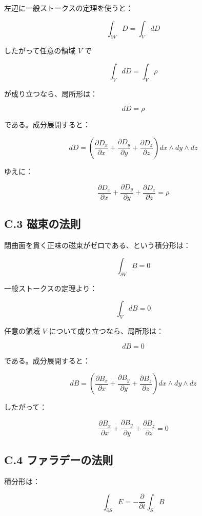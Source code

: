 \documentclass[a4paper,12pt,openany]{book}
\begin{document}
左辺に一般ストークスの定理を使うと：

\[
\int_{\partial V}D=\int_V dD
\]

したがって任意の領域 \(V\) で

\[
\int_V dD=\int_V\rho
\]

が成り立つなら、局所形は：

\[
dD=\rho
\]

である。成分展開すると：

\[
dD
=
\left(\frac{\partial D_x}{\partial x}
{}+\frac{\partial D_y}{\partial y}
{}+\frac{\partial D_z}{\partial z}\right)
dx\wedge dy\wedge dz
\]

ゆえに：

\[
\frac{\partial D_x}{\partial x}
{}+\frac{\partial D_y}{\partial y}
{}+\frac{\partial D_z}{\partial z}
=\rho
\]

\hypertarget{c.3-ux78c1ux675fux306eux6cd5ux5247}{%
\subsection*{C.3 磁束の法則}\label{c.3-ux78c1ux675fux306eux6cd5ux5247}}

閉曲面を貫く正味の磁束がゼロである、という積分形は：

\[
\int_{\partial V}B=0
\]

一般ストークスの定理より：

\[
\int_V dB=0
\]

任意の領域 \(V\) について成り立つなら、局所形は：

\[
dB=0
\]

である。成分展開すると：

\[
dB
=
\left(\frac{\partial B_x}{\partial x}
{}+\frac{\partial B_y}{\partial y}
{}+\frac{\partial B_z}{\partial z}\right)
dx\wedge dy\wedge dz
\]

したがって：

\[
\frac{\partial B_x}{\partial x}
{}+\frac{\partial B_y}{\partial y}
{}+\frac{\partial B_z}{\partial z}
=0
\]

\hypertarget{c.4-ux30d5ux30a1ux30e9ux30c7ux30fcux306eux6cd5ux5247}{%
\subsection*{C.4
ファラデーの法則}\label{c.4-ux30d5ux30a1ux30e9ux30c7ux30fcux306eux6cd5ux5247}}

積分形は：

\[
\int_{\partial S}E
=
-\frac{\partial}{\partial t}\int_S B
\]
\end{document}
